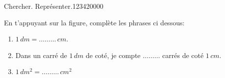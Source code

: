 \begin{pageAD} 

 
\begin{ExoCad}{Chercher. Représenter.}{1234}{2}{0}{0}{0}{0}


En t'appuyant sur la figure, complète les phrases ci dessous:

\begin{enumerate}
\item $1 \,dm = \dots \ldots \ldots\,cm$.
\item Dans un carré de $1 \,dm$ de coté, je compte $\dots\ldots \ldots$ carrés de coté $1\,cm$.
\item $1 \,dm^2 = \dots \ldots\ldots \,cm^2$
\end{enumerate}




\end{ExoCad}
\end{pageAD}
